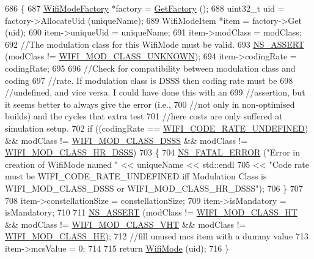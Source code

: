 \begin{DoxyCode}
686 \{
687   \hyperlink{classns3_1_1WifiModeFactory_a5f3f228863909a09b3f90b2a141c5c79}{WifiModeFactory} *factory = \hyperlink{classns3_1_1WifiModeFactory_a9c6f695d733355dee8d74bd1709868fc}{GetFactory} ();
688   uint32\_t uid = factory->AllocateUid (uniqueName);
689   WifiModeItem *item = factory->Get (uid);
690   item->uniqueUid = uniqueName;
691   item->modClass = modClass;
692   \textcolor{comment}{//The modulation class for this WifiMode must be valid.}
693   \hyperlink{assert_8h_a6dccdb0de9b252f60088ce281c49d052}{NS\_ASSERT} (modClass != \hyperlink{namespacens3_aa999e1221606a2b21b1eb33c2007c217a4db05f7ce5020b3be5160465120250e5}{WIFI\_MOD\_CLASS\_UNKNOWN});
694   item->codingRate = codingRate;
695 
696   \textcolor{comment}{//Check for compatibility between modulation class and coding}
697   \textcolor{comment}{//rate. If modulation class is DSSS then coding rate must be}
698   \textcolor{comment}{//undefined, and vice versa. I could have done this with an}
699   \textcolor{comment}{//assertion, but it seems better to always give the error (i.e.,}
700   \textcolor{comment}{//not only in non-optimised builds) and the cycles that extra test}
701   \textcolor{comment}{//here costs are only suffered at simulation setup.}
702   \textcolor{keywordflow}{if} ((codingRate == \hyperlink{namespacens3_aeaf3a86fd4bdb7829955238fba43e2adab3a130183c58362e3825366228ebf7ba}{WIFI\_CODE\_RATE\_UNDEFINED}) && modClass != 
      \hyperlink{namespacens3_aa999e1221606a2b21b1eb33c2007c217aed8070e1ee089724d73fe63030cc112c}{WIFI\_MOD\_CLASS\_DSSS} && modClass != \hyperlink{namespacens3_aa999e1221606a2b21b1eb33c2007c217a3c847bbae970f2de31e7b4eb7ff49840}{WIFI\_MOD\_CLASS\_HR\_DSSS})
703     \{
704       \hyperlink{group__fatal_ga5131d5e3f75d7d4cbfd706ac456fdc85}{NS\_FATAL\_ERROR} (\textcolor{stringliteral}{"Error in creation of WifiMode named "} << uniqueName << std::endl
705                                                              << \textcolor{stringliteral}{"Code rate must be WIFI\_CODE\_RATE\_UNDEFINED
       iff Modulation Class is WIFI\_MOD\_CLASS\_DSSS or WIFI\_MOD\_CLASS\_HR\_DSSS"});
706     \}
707 
708   item->constellationSize = constellationSize;
709   item->isMandatory = isMandatory;
710 
711   \hyperlink{assert_8h_a6dccdb0de9b252f60088ce281c49d052}{NS\_ASSERT} (modClass != \hyperlink{namespacens3_aa999e1221606a2b21b1eb33c2007c217a6ac45cac36cc4454649435d24ebf349c}{WIFI\_MOD\_CLASS\_HT} && modClass != 
      \hyperlink{namespacens3_aa999e1221606a2b21b1eb33c2007c217a9863e4342bf5c238c74dddfc4d96c67e}{WIFI\_MOD\_CLASS\_VHT} && modClass != \hyperlink{namespacens3_aa999e1221606a2b21b1eb33c2007c217abfa4f7272510045a9b43e8ac27ac13b0}{WIFI\_MOD\_CLASS\_HE});
712   \textcolor{comment}{//fill unused mcs item with a dummy value}
713   item->mcsValue = 0;
714 
715   \textcolor{keywordflow}{return} \hyperlink{classns3_1_1WifiModeFactory_af4f7ddea2391d3900ddb643f3bfeeefd}{WifiMode} (uid);
716 \}
\end{DoxyCode}


